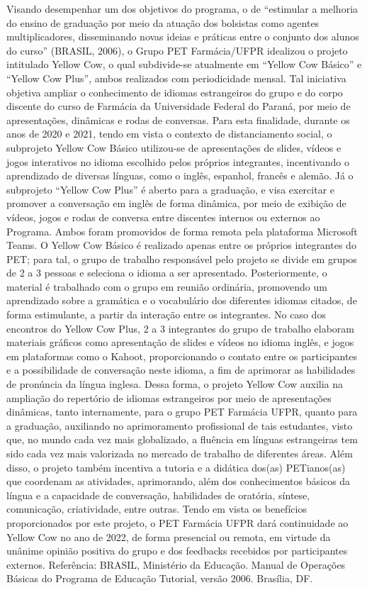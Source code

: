 Visando desempenhar um dos objetivos do programa, o de “estimular a melhoria do
ensino de graduação por meio da atuação dos bolsistas como agentes multiplicadores,
disseminando novas ideias e práticas entre o conjunto dos alunos do curso” (BRASIL, 2006),
o Grupo PET Farmácia/UFPR idealizou o projeto intitulado Yellow Cow, o qual subdivide-se
atualmente em “Yellow Cow Básico” e “Yellow Cow Plus”, ambos realizados com
periodicidade mensal. Tal iniciativa objetiva ampliar o conhecimento de idiomas estrangeiros
do grupo e do corpo discente do curso de Farmácia da Universidade Federal do Paraná, por
meio de apresentações, dinâmicas e rodas de conversas.
Para esta finalidade, durante os anos de 2020 e 2021, tendo em vista o contexto de
distanciamento social, o subprojeto Yellow Cow Básico utilizou-se de apresentações de slides,
vídeos e jogos interativos no idioma escolhido pelos próprios integrantes, incentivando o
aprendizado de diversas línguas, como o inglês, espanhol, francês e alemão. Já o subprojeto
“Yellow Cow Plus” é aberto para a graduação, e visa exercitar e promover a conversação em
inglês de forma dinâmica, por meio de exibição de vídeos, jogos e rodas de conversa entre
discentes internos ou externos ao Programa. Ambos foram promovidos de forma remota pela
plataforma Microsoft Teams.
O Yellow Cow Básico é realizado apenas entre os próprios integrantes do PET; para
tal, o grupo de trabalho responsável pelo projeto se divide em grupos de 2 a 3 pessoas e
seleciona o idioma a ser apresentado. Posteriormente, o material é trabalhado com o grupo em
reunião ordinária, promovendo um aprendizado sobre a gramática e o vocabulário dos
diferentes idiomas citados, de forma estimulante, a partir da interação entre os integrantes.
No caso dos encontros do Yellow Cow Plus, 2 a 3 integrantes do grupo de trabalho
elaboram materiais gráficos como apresentação de slides e vídeos no idioma inglês, e jogos
em plataformas como o Kahoot, proporcionando o contato entre os participantes e a
possibilidade de conversação neste idioma, a fim de aprimorar as habilidades de pronúncia da
língua inglesa.
Dessa forma, o projeto Yellow Cow auxilia na ampliação do repertório de idiomas
estrangeiros por meio de apresentações dinâmicas, tanto internamente, para o grupo PET
Farmácia UFPR, quanto para a graduação, auxiliando no aprimoramento profissional de tais
estudantes, visto que, no mundo cada vez mais globalizado, a fluência em línguas estrangeiras
tem sido cada vez mais valorizada no mercado de trabalho de diferentes áreas. Além disso, o
projeto também incentiva a tutoria e a didática dos(as) PETianos(as) que coordenam as
atividades, aprimorando, além dos conhecimentos básicos da língua e a capacidade de
conversação, habilidades de oratória, síntese, comunicação, criatividade, entre outras.
Tendo em vista os benefícios proporcionados por este projeto, o PET Farmácia UFPR
dará continuidade ao Yellow Cow no ano de 2022, de forma presencial ou remota, em virtude
da unânime opinião positiva do grupo e dos feedbacks recebidos por participantes externos.
Referência:
BRASIL, Ministério da Educação. Manual de Operações Básicas do Programa de Educação
Tutorial, versão 2006. Brasília, DF.

